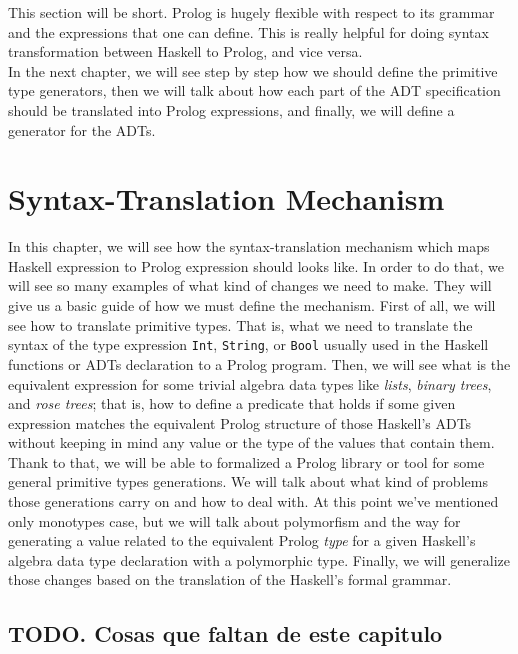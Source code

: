 \documentclass{report}
\theoremstyle{definition}
\theoremstyle{definition}
\newcommand{\ttt}[1]{\texttt{#1}}
\begin{document}
This section will be short. Prolog is hugely flexible with respect to its grammar and the expressions that one can define. This is really helpful for doing syntax transformation between Haskell to Prolog, and vice versa.\\

In the next chapter, we will see step by step how we should define the primitive type generators, then we will talk about how each part of the ADT specification should be translated into Prolog expressions, and finally, we will define a generator for the ADTs.

\chapter{Syntax-Translation Mechanism}

In this chapter, we will see how the syntax-translation mechanism which maps Haskell expression to Prolog expression should looks like. In order to do that, we will see so many examples of what kind of changes we need to make. They will give us a basic guide of how we must define the mechanism. First of all, we will see how to translate primitive types. That is, what we need to translate the syntax of the type expression \ttt{Int}, \ttt{String}, or \ttt{Bool} usually used in the Haskell functions or ADTs declaration to a Prolog program. Then, we will see what is the equivalent expression for some trivial algebra data types like \textit{lists}, \textit{binary trees}, and \textit{rose trees}; that is, how to define a predicate that holds if some given expression matches the equivalent Prolog structure of those Haskell's ADTs without keeping in mind any value or the type of the values that contain them. Thank to that, we will be able to formalized a Prolog library or tool for some general primitive types generations. We will talk about what kind of problems those generations carry on and how to deal with. At this point we've mentioned only monotypes case, but we will talk about polymorfism and the way for generating a value related to the equivalent Prolog \textit{type} for a given Haskell's algebra data type declaration with a polymorphic type. Finally, we will generalize those changes based on the translation of the Haskell's formal grammar.

\section*{TODO. Cosas que faltan de este capitulo}
\end{document}
